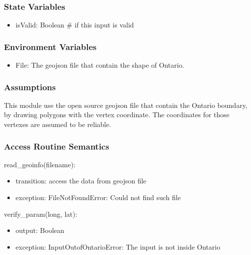 \documentclass[12pt, titlepage]{article}
\begin{document}
\subsubsection{State Variables}
\begin{itemize}

\item isValid: Boolean \# if this input is valid

\end{itemize}

\subsubsection{Environment Variables}
\begin{itemize}

\item File: The geojson file that contain the shape of Ontario.

\end{itemize}

\subsubsection{Assumptions}
This module use the open source geojson file that contain the Ontario boundary, by drawing polygons with the vertex coordinate. The coordinates for those vertexes are assumed to be reliable.

\subsubsection{Access Routine Semantics}
\noindent read\_geoinfo(filename):
\begin{itemize}
\item transition: access the data from geojson file
\item exception: FileNotFoundError: Could not find such file
\end{itemize}
\noindent verify\_param(long, lat):
\begin{itemize}
\item output: Boolean
\item exception: InputOutofOntarioError: The input is not inside Ontario
\end{itemize}
\end{document}
